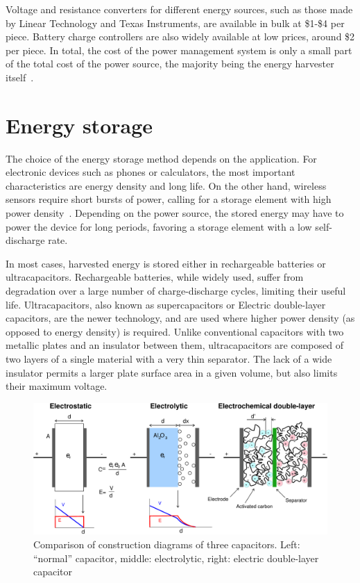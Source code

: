 \documentclass[a4paper,10pt]{article}
\begin{document}
Voltage and resistance converters for different energy sources, such as those made by Linear Technology and Texas Instruments, are available in bulk at \$1-\$4 per piece. Battery charge controllers are also widely available at low prices, around \$2 per piece. In total, the cost of the power management system is only a small part of the total cost of the power source, the majority being the energy harvester itself~\cite{lt:cenik, ti:eh}. 

\section{Energy storage}

The choice of the energy storage method depends on the application. For electronic devices such as phones or calculators, the most important characteristics are energy density and long life. On the other hand, wireless sensors require short bursts of power, calling for a storage element with high power density~\cite{cap-wsn-ieee}. Depending on the power source, the stored energy may have to power the device for long periods, favoring a storage element with a low self-discharge rate. 

In most cases, harvested energy is stored either in rechargeable batteries or ultracapacitors. Rechargeable batteries, while widely used, suffer from degradation over a large number of charge-discharge cycles, limiting their useful life. Ultracapacitors, also known as supercapacitors or Electric double-layer capacitors, are the newer technology, and are used where higher power density (as opposed to energy density) is required. Unlike conventional capacitors with two metallic plates and an insulator between them, ultracapacitors are composed of two layers of a single material with a very thin separator. The lack of a wide insulator permits a larger plate surface area in a given volume, but also limits their maximum voltage. 

\begin{figure}[h]
  \centering
  \includegraphics[width=.8\textwidth]{./Slike/Supercapacitor_diagram}
  \caption{Comparison of construction diagrams of three capacitors. Left: ``normal'' capacitor, middle: electrolytic, right: electric double-layer capacitor~\cite{wiki:edlc}}
  \label{fig:edlc-diagram}
\end{figure}
\end{document}
